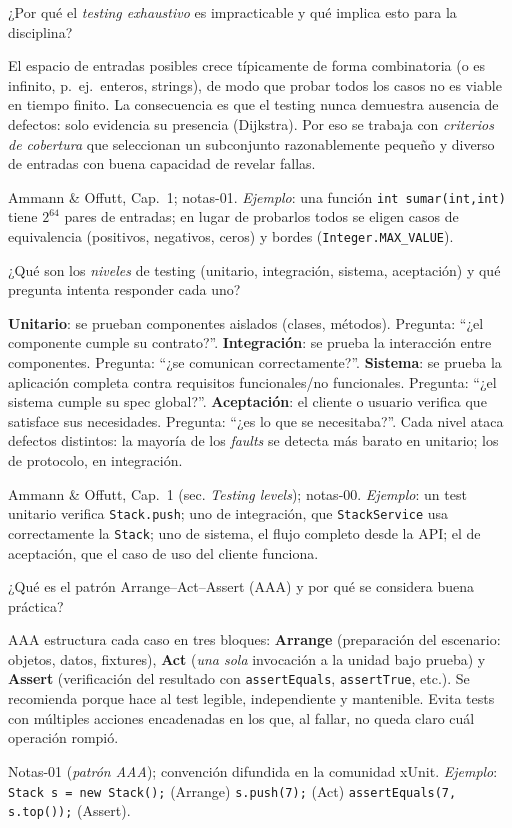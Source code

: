 \documentclass[11pt,a4paper]{article}
\newcounter{preg}
\newcommand{\qa}[3]{%
  \stepcounter{preg}%
  \vspace{0.4em}
  \begin{preguntabox}{\thepreg}
  #1
  \end{preguntabox}
  \begin{respuestabox}
  #2
  \end{respuestabox}
  \begin{refbox}
  #3
  \end{refbox}
  \vspace{0.6em}
}
\begin{document}
\qa{¿Por qué el \emph{testing exhaustivo} es impracticable y qué implica esto para la disciplina?}
{El espacio de entradas posibles crece típicamente de forma combinatoria (o es infinito, p.~ej.\ enteros, strings), de modo que probar todos los casos no es viable en tiempo finito. La consecuencia es que el testing nunca demuestra ausencia de defectos: solo evidencia su presencia (Dijkstra). Por eso se trabaja con \emph{criterios de cobertura} que seleccionan un subconjunto razonablemente pequeño y diverso de entradas con buena capacidad de revelar fallas.}
{Ammann \& Offutt, Cap.~1; notas-01. \emph{Ejemplo}: una función \texttt{int sumar(int,int)} tiene $2^{64}$ pares de entradas; en lugar de probarlos todos se eligen casos de equivalencia (positivos, negativos, ceros) y bordes (\texttt{Integer.MAX\_VALUE}).}

\qa{¿Qué son los \emph{niveles} de testing (unitario, integración, sistema, aceptación) y qué pregunta intenta responder cada uno?}
{\textbf{Unitario}: se prueban componentes aislados (clases, métodos). Pregunta: ``¿el componente cumple su contrato?''. \textbf{Integración}: se prueba la interacción entre componentes. Pregunta: ``¿se comunican correctamente?''. \textbf{Sistema}: se prueba la aplicación completa contra requisitos funcionales/no funcionales. Pregunta: ``¿el sistema cumple su spec global?''. \textbf{Aceptación}: el cliente o usuario verifica que satisface sus necesidades. Pregunta: ``¿es lo que se necesitaba?''. Cada nivel ataca defectos distintos: la mayoría de los \emph{faults} se detecta más barato en unitario; los de protocolo, en integración.}
{Ammann \& Offutt, Cap.~1 (sec. \emph{Testing levels}); notas-00. \emph{Ejemplo}: un test unitario verifica \texttt{Stack.push}; uno de integración, que \texttt{StackService} usa correctamente la \texttt{Stack}; uno de sistema, el flujo completo desde la API; el de aceptación, que el caso de uso del cliente funciona.}

\qa{¿Qué es el patrón Arrange--Act--Assert (AAA) y por qué se considera buena práctica?}
{AAA estructura cada caso en tres bloques: \textbf{Arrange} (preparación del escenario: objetos, datos, fixtures), \textbf{Act} (\emph{una sola} invocación a la unidad bajo prueba) y \textbf{Assert} (verificación del resultado con \texttt{assertEquals}, \texttt{assertTrue}, etc.). Se recomienda porque hace al test legible, independiente y mantenible. Evita tests con múltiples acciones encadenadas en los que, al fallar, no queda claro cuál operación rompió.}
{Notas-01 (\emph{patrón AAA}); convención difundida en la comunidad xUnit. \emph{Ejemplo}: \texttt{Stack s = new Stack();} (Arrange) \texttt{s.push(7);} (Act) \texttt{assertEquals(7, s.top());} (Assert).}
\end{document}
